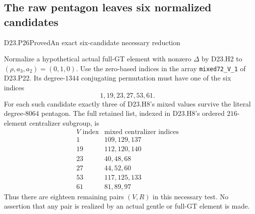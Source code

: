 \subsection{The raw pentagon leaves six normalized candidates}

\begin{statement}{D23.P26}{Proved}{An exact six-candidate necessary reduction}
\end{statement}
Normalize a hypothetical actual full-GT element with nonzero
$\Delta$ by D23.H2 to $(\rho,a_3,a_2)=(0,1,0)$.
Use the zero-based indices in the array
\texttt{mixed72\_V\_1} of D23.P22. Its degree-$1344$
conjugating permutation must have one of the six indices
\[
                         1,19,23,27,53,61.
\]
For each such candidate exactly three of D23.H8's mixed
values survive the literal degree-$8064$ pentagon. The full
retained list, indexed in D23.H8's ordered $216$-element
centralizer subgroup, is
\[
\begin{array}{c|l}
V\text{ index}&\text{mixed centralizer indices}\\\hline
1&109,129,137\\
19&112,120,140\\
23&40,48,68\\
27&44,52,60\\
53&117,125,133\\
61&81,89,97
\end{array}
\]
Thus there are eighteen remaining pairs $(V,R)$ in this
necessary test. No assertion that any pair is realized by
an actual gentle or full-GT element is made.


